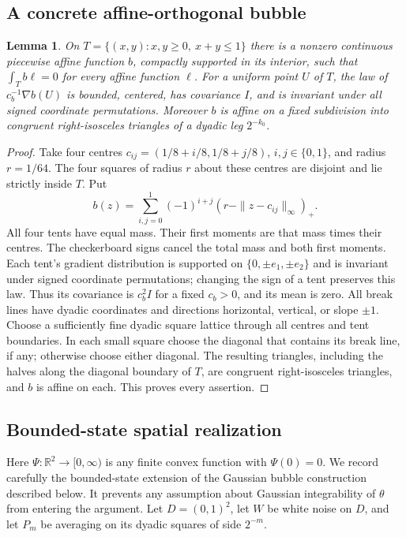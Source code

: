 \documentclass[11pt]{article}
\newtheorem{lemma}[theorem]{Lemma}
\numberwithin{equation}{section}
\begin{document}


\subsection{A concrete affine-orthogonal bubble}
\begin{lemma}\label{pair:lem:template}
On $T=\{(x,y):x,y\ge0,\ x+y\le1\}$ there is a nonzero continuous
piecewise affine function $b$, compactly supported in its interior, such
that $\int_T b\ell=0$ for every affine function $\ell$. For a uniform
point $U$ of $T$, the law of $c_b^{-1}\nabla b(U)$ is bounded, centered,
has covariance $I$, and is invariant under all signed coordinate
permutations. Moreover $b$ is affine on a fixed subdivision into congruent
right-isosceles triangles of a dyadic leg $2^{-k_0}$.
\end{lemma}
\begin{proof}
Take four centres $c_{ij}=(1/8+i/8,1/8+j/8)$, $i,j\in\{0,1\}$,
and radius $r=1/64$. The four squares of radius $r$ about these centres
are disjoint and lie strictly inside $T$. Put
\[
 b(z)=\sum_{i,j=0}^1(-1)^{i+j}(r-\|z-c_{ij}\|_\infty)_+.
\]
All four tents have equal mass. Their first moments are that mass times
their centres. The checkerboard signs cancel the total mass and both
first moments. Each tent's gradient distribution is supported on
$\{0,\pm e_1,\pm e_2\}$ and is invariant under signed coordinate
permutations; changing the sign of a tent preserves this law. Thus its
covariance is $c_b^2I$ for a fixed $c_b>0$, and its mean is zero.
All break lines have dyadic coordinates and directions horizontal,
vertical, or slope $\pm1$. Choose a sufficiently fine dyadic square
lattice through all centres and tent boundaries. In each small square
choose the diagonal that contains its break line, if any; otherwise
choose either diagonal. The resulting triangles, including the halves
along the diagonal boundary of $T$, are congruent right-isosceles
triangles, and $b$ is affine on each. This proves every assertion.
\end{proof}



\subsection{Bounded-state spatial realization}

Here $\Psi:\mathbb R^2\to[0,\infty)$ is any finite convex function with $\Psi(0)=0$. We record carefully the bounded-state extension of the Gaussian bubble
construction described below.  It prevents any assumption about Gaussian
integrability of \(\theta\) from entering the argument.  Let
\(D=(0,1)^2\), let \(W\) be white noise on \(D\), and let \(P_m\)
be averaging on its dyadic squares of side \(2^{-m}\).
\end{document}
